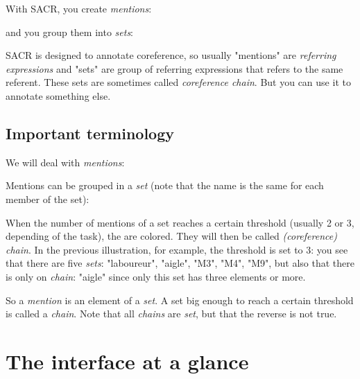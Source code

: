 \documentclass[12pt]{article}
\begin{document}
With SACR, you create \emph{mentions}:


and you group them into \emph{sets}:


SACR is designed to annotate coreference, so usually "mentions" are
\emph{referring expressions} and "sets" are group of referring expressions
that refers to the same referent.  These sets are sometimes called
\emph{coreference chain}.  But you can use it to annotate something else.

 \subsection{Important terminology}

\label{sec:terminology}

We will deal with \emph{mentions}:


Mentions can be grouped in a \emph{set} (note that the name is the same for
each member of the set):


When the number of mentions of a set reaches a certain threshold (usually 2
or 3, depending of the task), the are colored.  They will then be called
\emph{(coreference) chain}.  In the previous illustration, for example, the
threshold is set to 3: you see that there are five \emph{sets}: "laboureur",
"aigle", "M3", "M4", "M9", but also that there is only on \emph{chain}:
"aigle" since only this set has three elements or more.

So a \emph{mention} is an element of a \emph{set}.  A set big enough to reach
a certain threshold is called a \emph{chain}.  Note that all \emph{chains}
are \emph{set}, but that the reverse is not true.


 \section{The interface at a glance}

\end{document}
